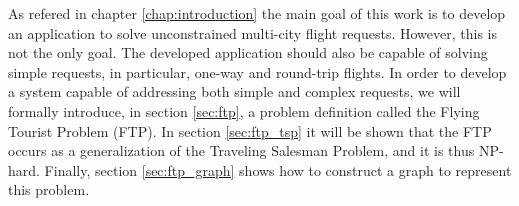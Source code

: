 As refered in chapter \ref{chap:introduction} the main goal of this work is to develop an application to solve unconstrained multi-city flight requests. However, this is not the only goal. The developed application should also be capable of solving simple requests, in particular, one-way and round-trip flights. In order to develop a system capable of addressing both simple and complex requests, we will formally introduce, in section \ref{sec:ftp}, a problem definition called the Flying Tourist Problem (FTP). In section \ref{sec:ftp_tsp} it will be shown that the FTP occurs as a generalization of the Traveling Salesman Problem, and it is thus NP-hard. Finally, section \ref{sec:ftp_graph} shows how to construct a graph to represent this problem.